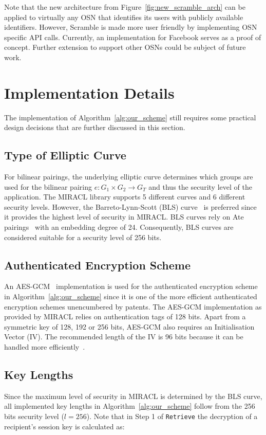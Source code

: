 Note that the new architecture from Figure~\ref{fig:new_scramble_arch} can be applied to virtually any OSN that identifies its users with publicly available identifiers. However, Scramble is made more user friendly by implementing OSN specific API calls. Currently, an implementation for Facebook serves as a proof of concept. Further extension to support other OSNs could be subject of future work.


\section{Implementation Details}
\label{sec:implementation_details}
The implementation of Algorithm~\ref{alg:our_scheme} still requires some practical design decisions that are further discussed in this section.

\subsection{Type of Elliptic Curve}
For bilinear pairings, the underlying elliptic curve determines which groups are used for the bilinear pairing ${e: G_1 \times G_2 \rightarrow G_T}$ and thus the security level of the application. The MIRACL library supports 5 different curves and 6 different security levels. However, the Barreto-Lynn-Scott (BLS) curve~\cite{art:BarretoLS02} is preferred since it provides the highest level of security in MIRACL. BLS curves rely on Ate pairings~\cite{art:HessSV06} with an embedding degree of 24. Consequently, BLS curves are considered suitable for a security level of 256 bits.

\subsection{Authenticated Encryption Scheme}
An AES-GCM~\cite{art:McGrewV04} implementation is used for the authenticated encryption scheme in Algorithm~\ref{alg:our_scheme} since it is one of the more efficient authenticated encryption schemes unencumbered by patents. The AES-GCM implementation as provided by MIRACL relies on authentication tags of 128 bits. Apart from a symmetric key of 128, 192 or 256 bits, AES-GCM also requires an Initialisation Vector (IV). The recommended length of the IV is 96 bits because it can be handled more efficiently~\cite{rfc5084}.

\subsection{Key Lengths}
Since the maximum level of security in MIRACL is determined by the BLS curve, all implemented key lengths in Algorithm~\ref{alg:our_scheme} follow from the 256 bits security level ($l=256$). Note that in Step 1 of \texttt{Retrieve} the decryption of a recipient's session key is calculated as: 

